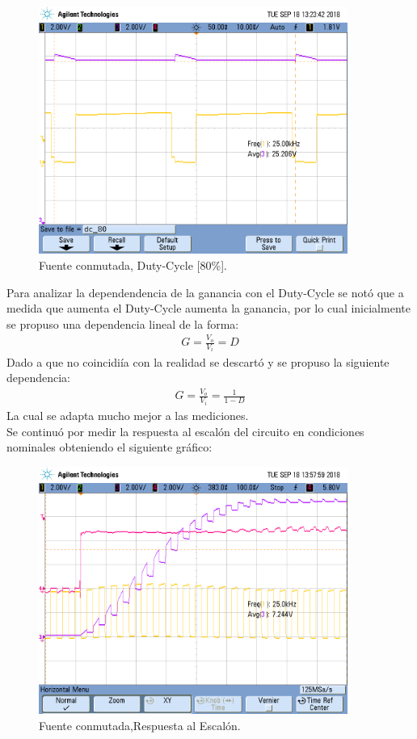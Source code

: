 \begin{figure}[H]
	\centering
	\includegraphics[width=0.9\textwidth]{Imagenes/dc_80.png}
\caption{Fuente conmutada, Duty-Cycle [80\%].}
	\label{fig:fcon80}
\end{figure}
Para analizar la dependendencia de la ganancia con el Duty-Cycle se notó que a medida que aumenta el Duty-Cycle aumenta la ganancia, por lo cual inicialmente se propuso una dependencia lineal de la forma:
\begin{align}G = \frac{V_o}{V_i} = D \end{align}
Dado a que no coincidiía con la realidad se descartó y se propuso la siguiente dependencia:
\begin{align}G = \frac{V_o}{V_i} = \frac{1}{1-D} \end{align}
La cual se adapta mucho mejor a las mediciones.\\
Se continuó por medir la respuesta al escalón del circuito en condiciones nominales obteniendo el siguiente gráfico:
\begin{figure}[H]
	\centering
	\includegraphics[width=0.9\textwidth]{Imagenes/sr.png}
\caption{Fuente conmutada,Respuesta al Escalón.}
	\label{fig:fconsr}
\end{figure}
